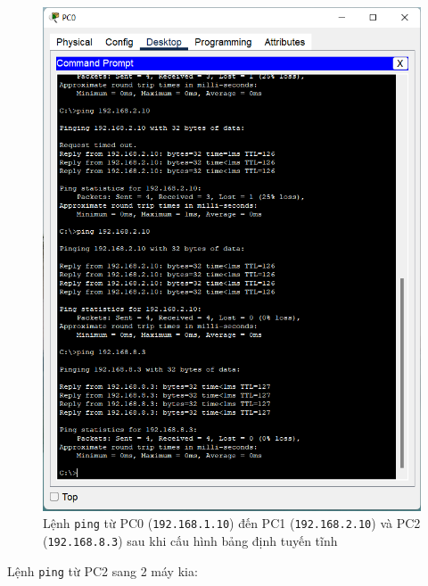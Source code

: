 \begin{enumerate}
\begin{figure}[H]
\begin{center}
\includegraphics[scale=1]{../figures/p1/p1-70}
\end{center}
\caption{Lệnh \texttt{ping} từ PC0 (\texttt{192.168.1.10}) đến PC1 (\texttt{192.168.2.10}) và PC2 (\texttt{192.168.8.3}) sau khi cấu hình bảng định tuyến tĩnh}
\end{figure}

Lệnh \texttt{ping} từ PC2 sang 2 máy kia:


\end{enumerate}
